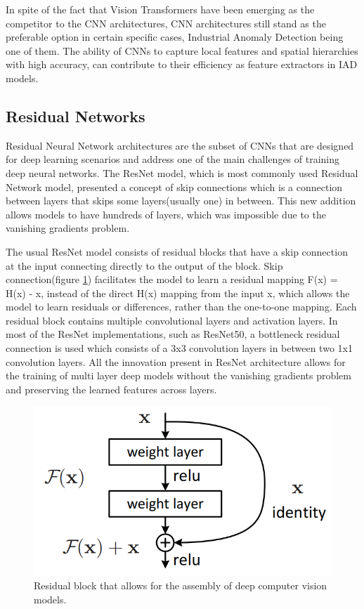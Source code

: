 In spite of the fact that Vision Transformers\cite{vit} have been emerging as the competitor to the CNN\cite{lenet} architectures, CNN\cite{lenet} architectures still stand as the preferable option in certain specific cases, Industrial Anomaly Detection\cite{iad_survey} being one of them. The ability of CNNs to capture local features and spatial hierarchies with high accuracy, can contribute to their efficiency as feature extractors in IAD models.

\subsection{Residual Networks}
\label{resnet}
Residual Neural Network\cite{resnet} architectures are the subset of CNNs\cite{lenet} that are designed for deep learning scenarios and address one of the main challenges of training deep neural networks. The ResNet model, which is most commonly used Residual Network model, presented a concept of skip connections which is a connection between layers that skips some layers(usually one) in between\cite{resnet}. This new addition allows models to have hundreds of layers, which was impossible due to the vanishing gradients problem.

The usual ResNet\cite{resnet} model consists of residual blocks that have a skip connection at the input connecting directly to the output of the block. Skip connection(figure \ref{fig:res_block}) facilitates the model to learn a residual mapping F(x) = H(x) - x, instead of the direct H(x) mapping from the input x, which allows the model to learn residuals or differences, rather than the one-to-one mapping\cite{resnet}. Each residual block contains multiple convolutional layers and activation layers. In most of the ResNet implementations, such as ResNet50\cite{resnet}, a bottleneck residual connection is used which consists of a 3x3 convolution layers in between two 1x1 convolution layers. All the innovation present in ResNet\cite{resnet} architecture allows for the training of multi layer deep models without the vanishing gradients problem and preserving the learned features across layers.

\begin{figure}[t]
	\begin{center}
		\includegraphics[width=0.5\linewidth]{Chapter_2/resnet.png}
	\end{center}
	\caption{Residual block that allows for the assembly of deep computer vision models.\cite{resnet}}
	\label{fig:res_block}
\end{figure}

